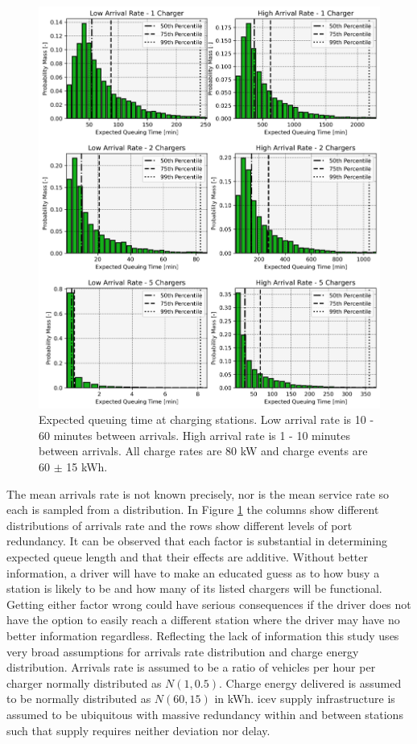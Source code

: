 \documentclass[11pt]{article}
\begin{document}
\begin{multicols}{2}
\begin{figure}[H]
	\centering
	\includegraphics[width = \linewidth]{figs/expected_delay.png}
	\caption{Expected queuing time at charging stations. Low arrival rate is 10 - 60 minutes between arrivals. High arrival rate is 1 - 10 minutes between arrivals. All charge rates are 80 kW and charge events are 60 $\pm$ 15 kWh.}
	\label{fig:expected_delay}
\end{figure}

The mean arrivals rate is not known precisely, nor is the mean service rate so each is sampled from a distribution. In Figure \ref{fig:expected_delay} the columns show different distributions of arrivals rate and the rows show different levels of port redundancy. It can be observed that each factor is substantial in determining expected queue length and that their effects are additive. Without better information, a driver will have to make an educated guess as to how busy a station is likely to be and how many of its listed chargers will be functional. Getting either factor wrong could have serious consequences if the driver does not have the option to easily reach a different station where the driver may have no better information regardless. Reflecting the lack of information this study uses very broad assumptions for arrivals rate distribution and charge energy distribution. Arrivals rate is assumed to be a ratio of vehicles per hour per charger normally distributed as $N(1, 0.5)$. Charge energy delivered is assumed to be normally distributed as $N(60, 15)$ in kWh. \gls{icev} supply infrastructure is assumed to be ubiquitous with massive redundancy within and between stations such that supply requires neither deviation nor delay.


\end{multicols}
\end{document}
